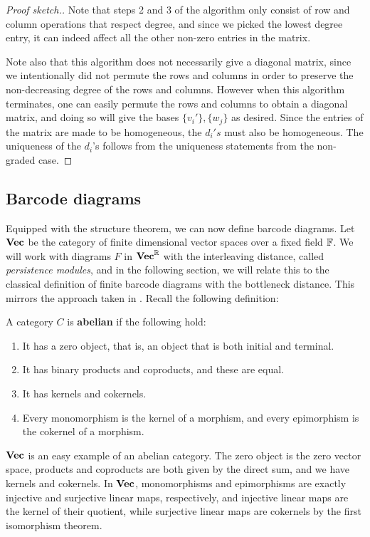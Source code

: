 \begin{proof}[Proof sketch.]
    Note that steps 2 and 3 of the algorithm only consist of row and column operations that respect degree, and since we picked the lowest degree entry, it can indeed affect all the other non-zero entries in the matrix. 

    Note also that this algorithm does not necessarily give a diagonal matrix, since we intentionally did not permute the rows and columns in order to preserve the non-decreasing degree of the rows and columns. However when this algorithm terminates, one can easily permute the rows and columns to obtain a diagonal matrix, and doing so will give the bases \(\{v_i'\}, \{w_j\}\) as desired. Since the entries of the matrix are made to be homogeneous, the \(d_i's\) must also be homogeneous. The uniqueness of the \(d_i\)'s follows from the uniqueness statements from the non-graded case.
\end{proof}


\subsection{Barcode diagrams}\label{sec:barcodes}

Equipped with the structure theorem, we can now define barcode diagrams. Let $\mathbf{Vec}$ be the category of finite dimensional vector spaces over a fixed field $\mathbb{F}$. We will work with diagrams $F$ in $\mathbf{Vec}^{\mathbb{R}}$ with the interleaving distance, called \textit{persistence modules}, and in the following section, we will relate this to the classical definition of finite barcode diagrams with the bottleneck distance. This mirrors the approach taken in \cite{Bubenik2014}. Recall the following definition:
\begin{definition}
    A category $C$ is \textbf{abelian} if the following hold:
    \begin{enumerate}[(1)]
    \item It has a zero object, that is, an object that is both initial and terminal.
    \item It has binary products and coproducts, and these are equal.
    \item It has kernels and cokernels.
    \item Every monomorphism is the kernel of a morphism, and every epimorphism is the cokernel of a morphism.
    \end{enumerate}
\end{definition}
$\mathbf{Vec}$ is an easy example of an abelian category. The zero object is the zero vector space, products and coproducts are both given by the direct sum, and we have kernels and cokernels. In $\mathbf{Vec}$, monomorphisms and epimorphisms are exactly injective and surjective linear maps, respectively, and injective linear maps are the kernel of their quotient, while surjective linear maps are cokernels by the first isomorphism theorem. 

